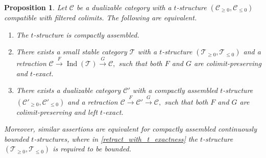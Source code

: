 \documentclass[11pt,leqno]{amsart}
\newtheorem{prop}[theo]{Proposition}
\numberwithin{equation}{section}
\newcommand{\xto}{\xrightarrow}
\newcommand{\cC}{{\mathcal C}}
\newcommand{\cT}{{\mathcal T}}
\newcommand{\Ind}{\operatorname{Ind}}
\begin{document}
\begin{prop}\label{prop:comp_ass_t_structure_via_retracts}
Let $\cC$ be a dualizable category with a $t$-structure $(\cC_{\geq 0},\cC_{\leq 0})$ compatible with filtered colimits. The following are equivalent.
\begin{enumerate}[label=(\roman*),ref=(\roman*)]
	\item The $t$-structure is compactly assembled. \label{comp_ass_t_structure}
	\item There exists a small stable category $\cT$ with a $t$-structure $(\cT_{\geq 0},\cT_{\leq 0})$ and a retraction $\cC\xto{F}\Ind(\cT)\xto{G}\cC,$ such that both $F$ and $G$ are colimit-preserving and $t$-exact. \label{retract_with_t_exactness}
	\item There exists a dualizable category $\cC'$ with a compactly assembled $t$-structure $(\cC'_{\geq 0},\cC'_{\leq 0})$ and a retraction $\cC\xto{F}\cC'\xto{G}\cC,$ such that both $F$ and $G$ are colimit-preserving and left $t$-exact. \label{retract_with_left_t_exactness}
\end{enumerate}
Moreover, similar assertions are equivalent for compactly assembled continuously bounded $t$-structures, where in \ref{retract_with_t_exactness} the $t$-structure $(\cT_{\geq 0},\cT_{\leq 0})$ is required to be bounded.
\end{prop}
\end{document}
